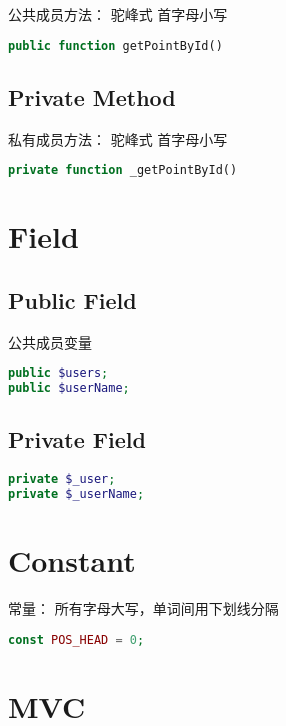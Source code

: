 公共成员方法： 驼峰式 首字母小写


\begin{lstlisting}[language=PHP]
public function getPointById()
\end{lstlisting}


\subsection{Private Method}

私有成员方法： 驼峰式 首字母小写

\begin{lstlisting}[language=PHP]
private function _getPointById()
\end{lstlisting}

\section{Field}


\subsection{Public Field}

公共成员变量

\begin{lstlisting}[language=PHP]
public $users;
public $userName;
\end{lstlisting}


\subsection{Private Field}


\begin{lstlisting}[language=PHP]
private $_user;
private $_userName;
\end{lstlisting}

\section{Constant}


常量： 所有字母大写，单词间用下划线分隔



\begin{lstlisting}[language=PHP]
const POS_HEAD = 0;
\end{lstlisting}


\section{MVC}



